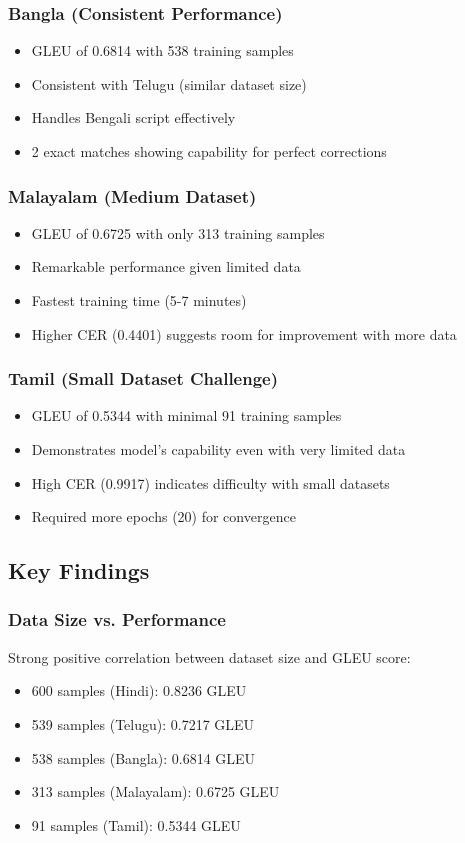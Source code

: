 \documentclass[12pt,a4paper]{article}
\begin{document}
\subsubsection{Bangla (Consistent Performance)}
\begin{itemize}
    \item GLEU of 0.6814 with 538 training samples
    \item Consistent with Telugu (similar dataset size)
    \item Handles Bengali script effectively
    \item 2 exact matches showing capability for perfect corrections
\end{itemize}

\subsubsection{Malayalam (Medium Dataset)}
\begin{itemize}
    \item GLEU of 0.6725 with only 313 training samples
    \item Remarkable performance given limited data
    \item Fastest training time (5-7 minutes)
    \item Higher CER (0.4401) suggests room for improvement with more data
\end{itemize}

\subsubsection{Tamil (Small Dataset Challenge)}
\begin{itemize}
    \item GLEU of 0.5344 with minimal 91 training samples
    \item Demonstrates model's capability even with very limited data
    \item High CER (0.9917) indicates difficulty with small datasets
    \item Required more epochs (20) for convergence
\end{itemize}

\subsection{Key Findings}

\subsubsection{Data Size vs. Performance}
Strong positive correlation between dataset size and GLEU score:
\begin{itemize}
    \item 600 samples (Hindi): 0.8236 GLEU
    \item 539 samples (Telugu): 0.7217 GLEU
    \item 538 samples (Bangla): 0.6814 GLEU
    \item 313 samples (Malayalam): 0.6725 GLEU
    \item 91 samples (Tamil): 0.5344 GLEU
\end{itemize}
\end{document}
